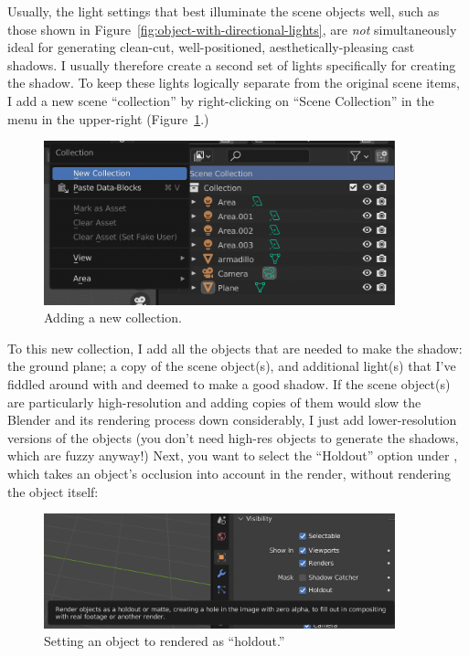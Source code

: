 \documentclass[10pt]{article}
\begin{document}
Usually, the light settings that best illuminate the scene objects well, such as those shown in Figure~\ref{fig:object-with-directional-lights}, are \textit{not} simultaneously ideal for generating clean-cut, well-positioned, aesthetically-pleasing cast shadows. I usually therefore create a second set of lights specifically for creating the shadow. To keep these lights logically separate from the original scene items, I add a new scene ``collection'' by right-clicking on ``Scene Collection'' in the  menu in the upper-right (Figure~\ref{fig:adding-a-new-collection}.)
\begin{figure}[H]
    \centering
    \captionsetup{width=0.8\textwidth}
    \includegraphics[width=4in]{images/adding-a-new-collection.png}
    \caption{Adding a new collection.}
    \label{fig:adding-a-new-collection}
\end{figure}
To this new collection, I add all the objects that are needed to make the shadow: the ground plane; a copy of the scene object(s), and additional light(s) that I've fiddled around with and deemed to make a good shadow. If the scene object(s) are particularly high-resolution and adding copies of them would slow the Blender and its rendering process down considerably, I just add lower-resolution versions of the objects (you don't need high-res objects to generate the shadows, which are fuzzy anyway!) Next, you want to select the ``Holdout'' option under , which takes an object's occlusion into account in the render, without rendering the object itself:
\begin{figure}[H]
    \centering
    \captionsetup{width=0.8\textwidth}
    \includegraphics[width=4in]{images/holdout.png}
    \caption{Setting an object to rendered as ``holdout.''}
    \label{fig:holdout}
\end{figure}
\end{document}

